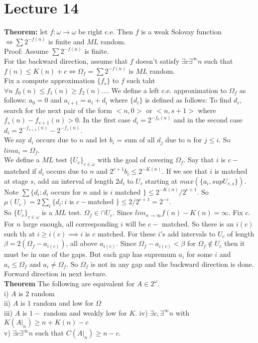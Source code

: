 \documentclass{article}
\begin{document}
      \section{Lecture 14}
      \textbf{Theorem:} let $f: \omega \to \omega$ be right c.e. Then $f$ is a weak Solovay function $\iff \sum 2^{-f(n)}$ is finite and $ML$ random.\\
      Proof: Assume $\sum 2^{-f(n)}$ is finite. \\
      For the backward direction, assume that $f$ doesn't satisfy $\exists c\exists^\infty n $ such that $f(n) \leq K(n) + c \iff \Omega_f = \sum 2^{-f(n)}$ is $ML$ random. \\
      Fix a compute approximation $\{f_s\}$ to $f$ such taht $\forall n \; f_0(n)\leq f_1(n)\geq f_2(n)...$. We define a left c.e. approximation to $\Omega_f$ as follows: $a_0 = 0$ and $a_{i+1} = a_i+ d_i$ where $\{d_i\}$ is defined as follows: To find $d_i$, search for the next pair of the form $<n,0>$ or $<n,s+1>$ where $f_s(n) - f_{s+1}(n)> 0$. In the first case $d_i = 2^{-f_0(n)}$ and in the second case $d_i = 2^{-f_{s+1}(n)} - 2^{-f_s(n)}$.\\
      We say $d_i$ occurs due to $n$ and let $b_i$ = sum of all $d_j$ due to $n$ for $j\leq i$. So $lim a_i = \Omega_f$. \\
      We define a $ML$ test $\{U_c\}_{c \in \omega}$ with the goal of covering $\Omega_f$. Say that $i$ is $c-$ matched if $d_i$ occurs due to $n$ and $2^{c+1}b_i \leq 2^{-K(n)}$. If we see that $i$ is matched at stage $s$, add an interval of length $2d_i$ to $U_c$ starting at $max(\{a_i, sup U_{c,s}\}) $.\\Note $\sum \{d_i : d_i $ occurs for $n$ and is $i$ matched $\} \leq 2^{-K(n)}/2^{c+1}$. So $\mu(U_c) = 2\sum_i \{d_i : i $ is $c- $matched $\} \le 2/2^{c+1} = 2^{-c}$.\\
      So $\{U_c\}_{c\in \omega}$ is a $ML$ test. $\Omega_f \in \cap U_c$. Since $lim_{n \to \infty} f(n) - K(n) = \infty$. Fix $c$. For $n$ large enough, all corresponding $i$ will be $c-$ matched. So there is an $i(c)$ such th at $i \geq i(c) \implies i $ is $ c $ matched. For these $i'$s add intervals to $U_c$ of length $\beta = 2(\Omega_f - a_{i(c)})$, all above $a_{i(c)}$. Since $\Omega_f - a_{i(c)} < \beta$ for $\Omega_f \not \in U_c$ then it must be in one of the gaps. But each gap has supremum $a_i$ for some $i$ and $a_i \leq \Omega_f$ and $a_i \neq \Omega_f$. So $\Omega_f$ is not in any gap and the backward direction is done.\\
     Forward direction in next lecture.\\
      \textbf{Theorem}  The following are equivalent for $A \in 2^\omega$.\\
      i) $A$ is $2$ random \\
      ii) $A $ is $1$ random and low for $\Omega$\\
      iii) $A$ is $1-$ random and weakly low for $K$.
      iv) $\exists c, \exists^\infty n$ with $K(A|_n) \geq n+K(n) -c$\\
      v) $\exists c \exists^\infty n $ such that $C(A|_n) \geq n-c$.\\
\end{document}
